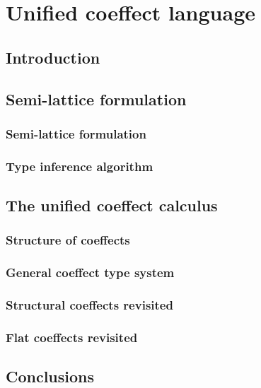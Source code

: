 
\chapter{Unified coeffect language} 
\label{ch:unified} 


\section{Introduction}


\section{Semi-lattice formulation}
\label{sec:unified-semilattice}

\subsection{Semi-lattice formulation}
\subsection{Type inference algorithm}


\section{The unified coeffect calculus}
\subsection{Structure of coeffects}
\subsection{General coeffect type system}
\subsection{Structural coeffects revisited}
\subsection{Flat coeffects revisited}


\section{Conclusions}
